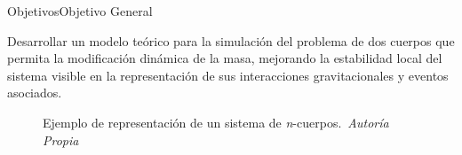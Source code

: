 \begin{frame}{Objetivos}{Objetivo General}
    \vspace{-0.15cm}
    \begin{minipage}[c]{0.65\textwidth}
        {\fontsize{8pt}{10pt}\selectfont
        Desarrollar un modelo teórico para la simulación del problema de dos cuerpos que permita la modificación dinámica de la masa, mejorando la estabilidad local del sistema visible en la representación de sus interacciones gravitacionales y eventos asociados.}
    \end{minipage}
    \hfill
    \begin{minipage}[c]{0.3\textwidth}
        \begin{figure}[H]
            \centering
            \vspace{-0.25cm}
            \caption{\tiny Ejemplo de representación de un sistema de \textit{n}-cuerpos.~\textit{Autoría Propia}}%
            \label{fig:genetic_algorithm_application}
        \end{figure}
    \end{minipage}
\end{frame}

